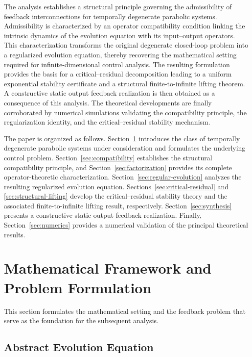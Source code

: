 \documentclass[pdflatex,sn-mathphys-num]{sn-jnl}
\theoremstyle{thmstyleone}%
\theoremstyle{thmstyletwo}%
\theoremstyle{thmstylethree}%
\begin{document}
The analysis establishes a structural principle governing the admissibility of feedback interconnections for temporally degenerate parabolic systems. Admissibility is characterized by an operator compatibility condition linking the intrinsic dynamics of the evolution equation with its input--output operators. This characterization transforms the original degenerate closed-loop problem into a regularized evolution equation, thereby recovering the mathematical setting required for infinite-dimensional control analysis. The resulting formulation provides the basis for a critical--residual decomposition leading to a uniform exponential stability certificate and a structural finite-to-infinite lifting theorem. A constructive static output feedback realization is then obtained as a consequence of this analysis. The theoretical developments are finally corroborated by numerical simulations validating the compatibility principle, the regularization identity, and the critical--residual stability mechanism.

The paper is organized as follows. Section~\ref{sec:problem}
introduces the class of temporally degenerate parabolic systems under consideration and formulates the underlying control problem.
Section~\ref{sec:compatibility} establishes the structural
compatibility principle, and Section~\ref{sec:factorization} provides its complete operator-theoretic characterization.
Section~\ref{sec:regular-evolution} analyzes the resulting regularized evolution equation.
Sections~\ref{sec:critical-residual} and \ref{sec:structural-lifting} develop the critical--residual stability theory and the associated finite-to-infinite lifting result, respectively.
Section~\ref{sec:synthesis} presents a constructive static output feedback realization.
Finally, Section~\ref{sec:numerics} provides a numerical validation of the principal theoretical results.

\section{Mathematical Framework and Problem Formulation}
\label{sec:problem}

This section formulates the mathematical setting and the feedback problem that serve as the foundation for the subsequent analysis.

\subsection{Abstract Evolution Equation}
\label{subsec:abstract-framework}
\end{document}
